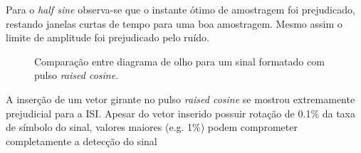 Para o \textit{half sine} observa-se que o instante ótimo de amostragem foi prejudicado, restando janelas curtas de tempo para uma boa amostragem. Mesmo assim o limite de amplitude foi prejudicado pelo ruído.

\begin{figure}[H]
\begin{center}
\end{center}
\caption{Comparação entre diagrama de olho para um sinal formatado com pulso \textit{raised cosine}.}
\label{fig:2} 
\end{figure}

A inserção de um vetor girante no pulso \textit{raised cosine} se mostrou extremamente prejudicial para a ISI. Apesar do vetor inserido possuir rotação de 0.1\% da taxa de símbolo do sinal, valores maiores (e.g. 1\%) podem comprometer completamente a detecção do sinal

